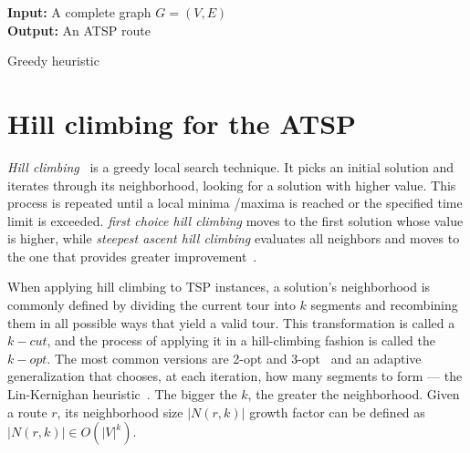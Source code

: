 \begin{algorithm}
  \textbf{Input:} A complete graph $G=(V,E)$ \\
  \textbf{Output:} An ATSP route
  \begin{algorithmic}[1]
    \ENDFOR
      \ENDIF
    \ENDFOR

        \ENDWHILE
      \ENDIF
    \ENDFOR
  \end{algorithmic}
  \caption{Greedy heuristic}
  \label{algorithm:greedy}
\end{algorithm}

\section{Hill climbing for the ATSP}
\label{section:hill-climbing}

\textit{Hill climbing}~\citep{Russel2003} is a greedy local search technique. It
picks an initial solution and iterates through its neighborhood, looking for a
solution with higher value. This process is repeated until a local minima
\slash maxima is reached or the specified time limit is exceeded.
\textit{first choice hill climbing} moves to the first solution whose value is
higher, while \textit{steepest ascent hill climbing} evaluates all neighbors
and moves to the one that provides greater improvement~\citep{Russel2003}. 

When applying hill climbing to TSP instances, a solution's neighborhood is
commonly defined by dividing the current tour into $k$ segments and recombining
them in all possible ways that yield a valid tour. This transformation is
called a $k-cut$, and the process of applying it in a hill-climbing fashion is
called the $k-opt$. The most common versions are 2-opt and
3-opt~\citep{Johnson1997} and an adaptive generalization that chooses, at each
iteration, how many segments to form --- the Lin-Kernighan
heuristic~\citep{Johnson1997}. The bigger the $k$, the greater the neighborhood.
Given a route $r$, its neighborhood size $|N(r,k)|$ growth factor can be
defined as $|N(r,k)| \in O(|V|^k)$.

